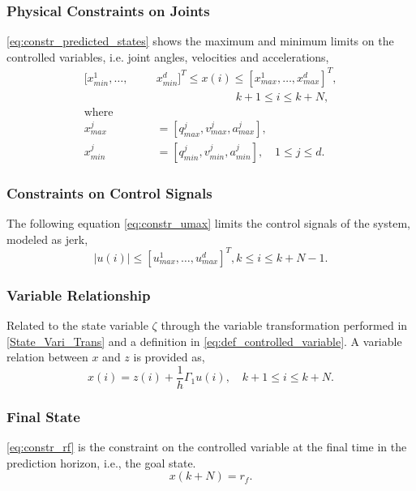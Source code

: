 \documentclass[final]{LTHtwocol} %
\begin{document}
\subsubsection{Physical Constraints on Joints} \eqref{eq:constr_predicted_states} shows the maximum and minimum limits on the controlled variables, i.e. joint angles, velocities and accelerations,
\begin{equation}
    \begin{split}
        [x_{min}^1, \dots,& x_{min}^d]^T \leq x(i) \leq [x_{max}^1, \dots, x_{max}^d]^T, \\
        & \quad\quad\quad\quad\quad\quad\quad k+1 \leq i \leq k+N, \\
        \textrm{where} \quad\quad\quad &\\ 
        x_{max}^j & = [q_{max}^j, v_{max}^j, a_{max}^j], \\ 
        x_{min}^j & = [q_{min}^j, v_{min}^j, a_{min}^j], \quad 1\leq j \leq d.
    \end{split}
    \label{eq:constr_predicted_states}
\end{equation}

\subsubsection{Constraints on Control Signals}
The following equation \eqref{eq:constr_umax} limits the control signals of the system, modeled as jerk,
\begin{equation}
    |u(i)|\leq [u_{max}^1, \dots, u_{max}^d]^T, k \leq i \leq k+N-1.
    \label{eq:constr_umax}
\end{equation}

\subsubsection{Variable Relationship}
Related to the state variable $\zeta$ through the variable transformation performed in \eqref{State_Vari_Trans} and a definition in \eqref{eq:def_controlled_variable}. A variable relation between $x$ and $z$ is provided as, 
\begin{equation}
    \label{eq:constr_variablechange}
    x(i) = z(i)+\frac{1}{h}\Gamma_1u(i), \quad k+1\leq i\leq k+N.
\end{equation}

\subsubsection{Final State}
\eqref{eq:constr_rf} is the constraint on the controlled variable at the final time in the prediction horizon, i.e., the goal state. 
\begin{equation}
    x(k+N) = r_f.
    \label{eq:constr_rf}
\end{equation}
\end{document}

